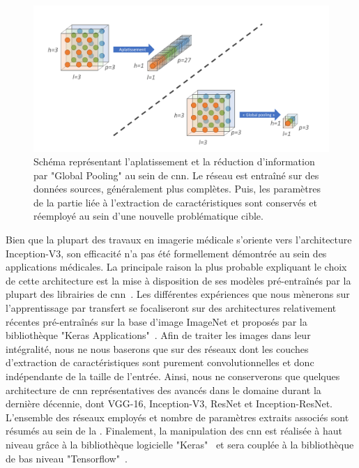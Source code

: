 \begin{figure}[H]
    \centering
    \includegraphics[width=\linewidth]{contents/chapter_4/resources/scheme_global_pooling.pdf}
    \caption{Schéma représentant l'aplatissement et la réduction d'information par "Global Pooling" au sein de \gls{cnn}. Le réseau est entraîné sur des données sources, généralement plus complètes. Puis, les paramètres de la partie liée à l'extraction de caractéristiques sont conservés et réemployé au sein d'une nouvelle problématique cible.}
    \label{fig:scheme_global_pooling}
\end{figure}\par

Bien que la plupart des travaux en imagerie médicale s'oriente vers l'architecture Inception-V3, son efficacité n'a pas été formellement démontrée au sein des applications médicales. La principale raison la plus probable expliquant le choix de cette architecture est la mise à disposition de ses modèles pré-entraînés par la plupart des librairies de \gls{cnn}~\cite{Litjens2017}. Les différentes expériences que nous mènerons sur l'apprentissage par transfert se focaliseront sur des architectures relativement récentes pré-entraînés sur la base d'image ImageNet et proposés par la bibliothèque "Keras Applications"~\cite{chollet2015a}. Afin de traiter les images dans leur intégralité, nous ne nous baserons que sur des réseaux dont les couches d'extraction de caractéristiques sont purement convolutionnelles et donc indépendante de la taille de l'entrée. Ainsi, nous ne conserverons que quelques architecture de \gls{cnn} représentatives des avancés dans le domaine durant la dernière décennie, dont VGG-16, Inception-V3, ResNet et Inception-ResNet. L'ensemble des réseaux employés et nombre de paramètres extraits associés sont résumés au sein de la . Finalement, la manipulation des \ac{cnn} est réalisée à haut niveau grâce à la bibliothèque logicielle "Keras"~\cite{chollet2015} et sera couplée à la bibliothèque de bas niveau "Tensorflow"~\cite{tensorflow2015}.\par

